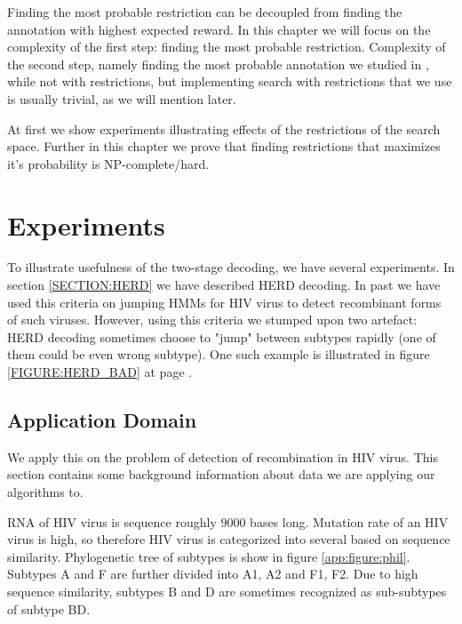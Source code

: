 Finding the most probable restriction can be decoupled from finding the
annotation with highest expected reward. In this chapter we will focus
 on the complexity of the first step: finding the most
probable restriction. Complexity of the second step, namely finding the most
probable annotation we studied in \cite{TODO}, while not with restrictions, but 
implementing search with restrictions that we use is usually trivial, as we will
mention later.

At first we show experiments illustrating effects of the restrictions of the
search space. Further in this chapter we prove that finding restrictions that
maximizes it's probability is NP-complete/hard.

\section{Experiments}

\begin{reformulate*}
To illustrate usefulness of the two-stage decoding, we have 
several experiments. In section \ref{SECTION:HERD} we have described HERD
decoding. In past we have used this criteria on jumping HMMs \cite{} for HIV
virus to detect recombinant forms of such viruses. However, using this criteria
we stumped upon two artefact: HERD decoding sometimes choose to "jump" between
subtypes rapidly (one of them could be even wrong subtype). One such example is
illustrated in figure \ref{FIGURE:HERD_BAD} at page \pageref{FIGURE:HERD_BAD}.
\end{reformulate*}

\subsection{Application Domain}
We apply this on the problem of detection of recombination in HIV virus. This
section contains some background information about data we are applying our
algorithms to. 

RNA of HIV virus is sequence roughly $9000$ bases long. Mutation rate of an HIV
virus is high, so therefore HIV virus is categorized into several
 based on sequence similarity.  Phylogenetic tree of
subtypes is show in figure \ref{app:figure:phil}.  Subtypes A and F are further
divided into  A1, A2 and F1, F2.  Due to high sequence
similarity, subtypes B and D are sometimes recognized as sub-subtypes of subtype
BD.

